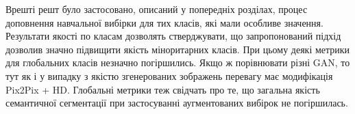 Врешті решт було застосовано, описаний у попередніх розділах,
процес доповнення навчальної вибірки для тих класів, які
мали особливе значення. Результати якості по класам дозволять стверджувати,
що запропонований підхід дозволив значно підвищити якість
міноритарних класів. При цьому деякі метрики для глобальних класів незначно
погіршились. Якщо ж порівнювати різні GAN, то тут як і у випадку з
якістю згенерованих зображень перевагу має модифікація Pix2Pix + HD.
Глобальні метрики теж свідчать про те, що загальна якість
семантичної сегментації при застосуванні аугментованих вибірок
не погіршилась.
